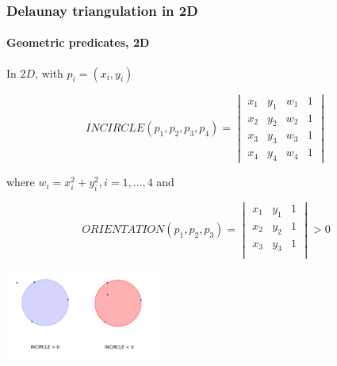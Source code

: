 \documentclass[c, 10pt]{beamer}
\begin{document}
\begin{frame}\frametitle{Delaunay triangulation in 2D}\framesubtitle{Geometric predicates, 2D}
\begin{small}
In $2D$, with $p_i = (x_i, y_i)$

$$INCIRCLE(p_1,p_2,p_3,p_4) = \begin{vmatrix} x_1 & y_1 & w_1 & 1 \\
x_2 & y_2 & w_2 & 1 \\
x_3 & y_3 &  w_3 & 1 \\
x_4 & y_4 &  w_4 & 1\end{vmatrix}$$

where $w_i = x_i^2  + y_i^2, i = 1,\dots, 4$ and 

$$ORIENTATION(p_1,p_2,p_3) = 
\begin{vmatrix} 
x_1 & y_1 & 1 \\
x_2 & y_2 & 1 \\
x_3 & y_3 & 1 \\
\end{vmatrix} > 0$$
\end{small}

\begin{center}
\includegraphics[height = 3cm]{./FigureLayout/Incircle.png}
\end{center}

\end{frame}
\end{document}
